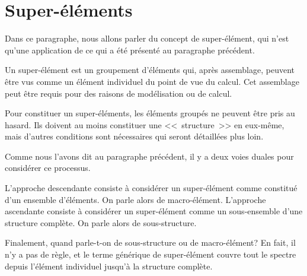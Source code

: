 
\medskip
\section{Super-éléments}

Dans ce paragraphe, nous allons parler du concept de super-élément, qui n'est qu'une
application de ce qui a été présenté au paragraphe précédent.

\medskip
Un super-élément est un groupement d'éléments qui, après
assemblage, peuvent être vus comme un élément individuel du point de vue du calcul.
Cet assemblage peut être requis pour des raisons de modélisation ou de calcul.

Pour constituer un super-éléments, les éléments groupés ne peuvent être
pris au hasard. Ils doivent au moins constituer une <<~structure~>> en eux-même, mais
d'autres conditions sont nécessaires qui seront détaillées plus loin.

Comme nous l'avons dit au paragraphe précédent, il y a deux voies duales pour considérer
ce processus.

L'approche descendante consiste à considérer un super-élément comme constitué
d'un ensemble d'éléments. On parle alors de macro-élément.
L'approche ascendante consiste à considérer un super-élément comme un sous-ensemble
d'une structure complète. On parle alors de sous-structure.

Finalement, quand parle-t-on de sous-structure ou de macro-élément?
En fait, il n'y a pas de règle, et le terme générique de super-élément couvre tout le
spectre depuis l'élément individuel jusqu'à la structure complète.


